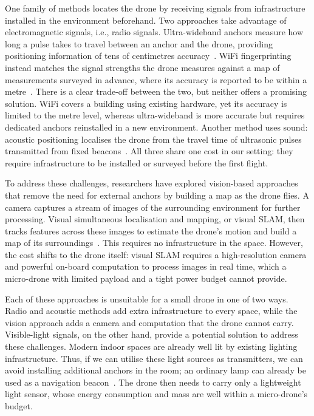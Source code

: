 One family of methods locates the drone by receiving signals from infrastructure installed in the environment beforehand. Two approaches take advantage of electromagnetic signals, i.e., radio signals. Ultra-wideband anchors measure how long a pulse takes to travel between an anchor and the drone, providing positioning information of tens of centimetres accuracy~\cite{queralta2020uwb}. WiFi fingerprinting instead matches the signal strengths the drone measures against a map of measurements surveyed in advance, where its accuracy is reported to be within a metre~\cite{zafari2019indoor}. There is a clear trade-off between the two, but neither offers a promising solution. WiFi covers a building using existing hardware, yet its accuracy is limited to the metre level, whereas ultra-wideband is more accurate but requires dedicated anchors reinstalled in a new environment. Another method uses sound: acoustic positioning localises the drone from the travel time of ultrasonic pulses transmitted from fixed beacons~\cite{sun2025acoustic, altena2023acoustic}. All three share one cost in our setting: they require infrastructure to be installed or surveyed before the first flight.

To address these challenges, researchers have explored vision-based approaches that remove the need for external anchors by building a map as the drone flies. A camera captures a stream of images of the surrounding environment for further processing. Visual simultaneous localisation and mapping, or visual SLAM, then tracks features across these images to estimate the drone's motion and build a map of its surroundings~\cite{murartal2017orbslam2}. This requires no infrastructure in the space. However, the cost shifts to the drone itself: visual SLAM requires a high-resolution camera and powerful on-board computation to process images in real time, which a micro-drone with limited payload and a tight power budget cannot provide.

Each of these approaches is unsuitable for a small drone in one of two ways. Radio and acoustic methods add extra infrastructure to every space, while the vision approach adds a camera and computation that the drone cannot carry. Visible-light signals, on the other hand, provide a potential solution to address these challenges. Modern indoor spaces are already well lit by existing lighting infrastructure. Thus, if we can utilise these light sources as transmitters, we can avoid installing additional anchors in the room; an ordinary lamp can already be used as a navigation beacon~\cite{pathak2015vlc}. The drone then needs to carry only a lightweight light sensor, whose energy consumption and mass are well within a micro-drone's budget.

